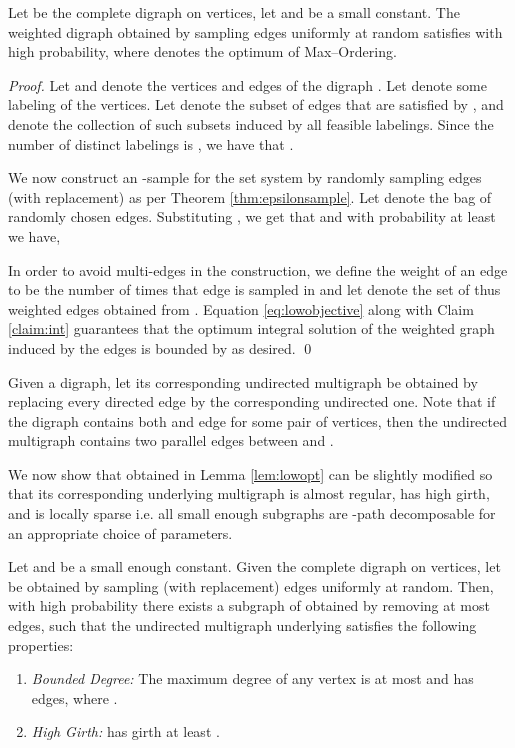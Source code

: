 \documentclass[oribibl]{llncs}
\newcommand{\maxk}{{\sc Max--Ordering}\xspace}
\begin{document}
\begin{lemma} \label{lem:lowopt} Let  be the complete
	digraph on  vertices, let  and
	 be a small constant. The weighted 
	digraph 
	obtained by sampling  edges
	uniformly at random satisfies  
	with high probability, where 
	denotes the optimum of \maxk.
\end{lemma}
\begin{proof} Let  and  denote the
	vertices and edges of the digraph . Let  denote some labeling of the vertices.
	Let 
	denote the subset of edges that are satisfied by
	, and  denote the collection of such subsets
	induced by all feasible labelings. Since the number of
	distinct labelings is , we have that . 

	We now construct an -sample for the set system  by randomly sampling edges (with replacement) as per
Theorem \ref{thm:epsilonsample}. Let  denote the bag of
randomly chosen  
edges. Substituting , we get that  and with probability at least  we have,
 
In order to avoid multi-edges in the construction, we define the
weight of an edge  to be the number of times that edge is
sampled in  and let  denote the set of thus weighted 
edges obtained
from . Equation
\eqref{eq:lowobjective} along with Claim \ref{claim:int}
guarantees that the optimum integral
solution of the weighted graph  induced by the edges  is
bounded by  as desired.
\qed
\end{proof}
Given a digraph, let its corresponding undirected multigraph be
obtained by replacing every directed edge by the corresponding
undirected one. Note that if the digraph contains both  and
 edge for some pair of vertices, then the undirected multigraph 
contains two parallel edges between  and . 

We now show that  
obtained in Lemma \ref{lem:lowopt} 
can be slightly modified 
so that its corresponding underlying multigraph is almost
regular, has high girth, and is locally sparse i.e. all small enough
subgraphs are -path decomposable for an appropriate choice of
parameters. 

\begin{lemma}
	\label{lem:girth} Let  and  be
	a small enough constant. Given the complete digraph 
	 on  vertices, let  
	be obtained by sampling (with replacement) 
   edges uniformly at random. 
  Then, with high probability there exists 
  a subgraph  of  obtained 
  by removing at most  edges, such that the undirected 
  multigraph  underlying  satisfies the following
  properties: 
  \begin{enumerate}
  \item \emph{Bounded Degree:} The maximum degree of any vertex is 
	  at most  and  has  edges,
	  where .
  \item \emph{High Girth:}  has girth at least .
  \end{enumerate}
\end{lemma}
\end{document}
